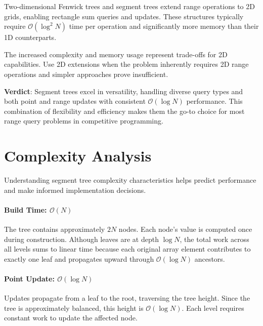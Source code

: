 Two-dimensional Fenwick trees and segment trees extend range operations to 2D grids, enabling rectangle sum queries and updates. These structures typically require $\mathcal{O}(\log^2 N)$ time per operation and significantly more memory than their 1D counterparts.

The increased complexity and memory usage represent trade-offs for 2D capabilities. Use 2D extensions when the problem inherently requires 2D range operations and simpler approaches prove insufficient.

\textbf{Verdict}: Segment trees excel in versatility, handling diverse query types and both point and range updates with consistent $\mathcal{O}(\log N)$ performance. This combination of flexibility and efficiency makes them the go-to choice for most range query problems in competitive programming.

\section{Complexity Analysis}
\label{sec:big_o_overview}

Understanding segment tree complexity characteristics helps predict performance and make informed implementation decisions.

\paragraph{Build Time: $\mathcal{O}(N)$} The tree contains approximately $2N$ nodes. Each node's value is computed once during construction. Although leaves are at depth $\log N$, the total work across all levels sums to linear time because each original array element contributes to exactly one leaf and propagates upward through $\mathcal{O}(\log N)$ ancestors.


\paragraph{Point Update: $\mathcal{O}(\log N)$} Updates propagate from a leaf to the root, traversing the tree height. Since the tree is approximately balanced, this height is $\mathcal{O}(\log N)$. Each level requires constant work to update the affected node.

